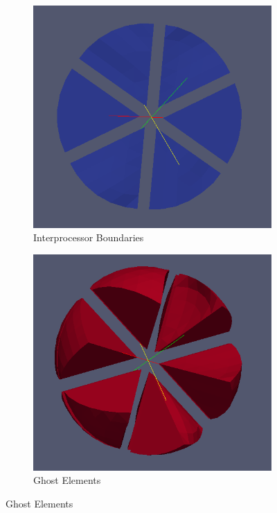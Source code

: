 \begin{figure}[H]
	\begin{subfigure}[b]{0.33\textwidth} \hspace{4mm} \includegraphics[scale=0.22]{images/32-pb}    \captionsetup{width=0.8\textwidth} \caption{ Interprocessor Boundaries} \end{subfigure}
	\begin{subfigure}[b]{0.46\textwidth} \vspace{5mm} \hspace{12mm} \includegraphics[scale=0.25]{images/32-ghost} \captionsetup{width=0.6\textwidth} \caption{ Ghost Elements} \end{subfigure}

\end{figure}
